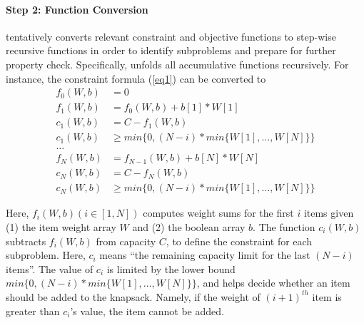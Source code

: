 \paragraph{Step 2: Function Conversion}
\tool tentatively converts relevant constraint and objective functions to step-wise recursive functions in order to identify subproblems and prepare for further property check. 
Specifically, 
\tool unfolds all accumulative functions 
recursively. 
For instance, the constraint formula (\ref{eq1}) can be converted to
\begin{align}
\label{fun1}
f_0(W, b)&=0 \nonumber\\
f_1(W, b)&=f_0(W, b) + b[1] * W[1] \nonumber\\
c_1(W, b)&=C-f_1(W, b)\nonumber\\
c_1(W, b)&\ge min\{0, (N - i) * min\{W[1], \ldots, W[N]\}\} \nonumber\\
\ldots \tag{3.3}\\  
f_N(W, b)&=f_{N-1}(W, b) + b[N] * W[N] \nonumber\\
c_N(W, b)&=C-f_N(W, b) \nonumber\\
c_N(W, b)& \ge min\{0, (N - i) * min\{W[1], \ldots, W[N]\}\} \nonumber
\end{align}

Here, $f_i(W, b) (i\in[1, N])$ computes weight sums for the first $i$ items given (1) the item weight array $W$ and (2) the boolean array $b$.
The function $c_i(W, b)$ subtracts $f_i(W, b)$ from capacity $C$, to define the constraint for each subproblem. Here, $c_i$ means ``the remaining capacity limit for the last $(N-i)$ items''. 
The value of $c_i$ is limited by the lower bound $min\{0, (N - i) * min\{W[1], \ldots, W[N]\}\}$, and helps decide whether an item should be added to the knapsack. Namely, if the weight of $(i+1)^{th}$ item is greater than $c_i$'s value, the item cannot be added.


